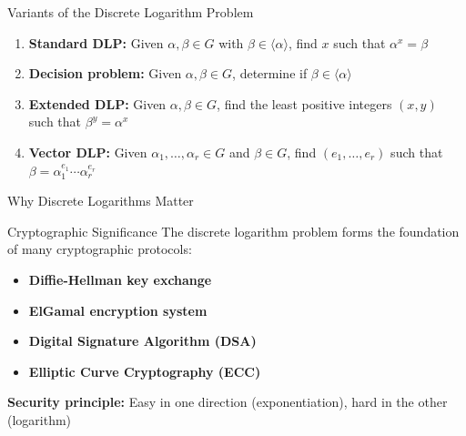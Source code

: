 \documentclass[aspectratio=169]{beamer}
\begin{document}
\begin{frame}{Variants of the Discrete Logarithm Problem}
  \begin{enumerate}
    \item \textbf{Standard DLP:} Given $\alpha, \beta \in G$ with $\beta \in \langle\alpha\rangle$, find $x$ such that $\alpha^x = \beta$
    
    \item \textbf{Decision problem:} Given $\alpha, \beta \in G$, determine if $\beta \in \langle\alpha\rangle$
    
    \item \textbf{Extended DLP:} Given $\alpha, \beta \in G$, find the least positive integers $(x,y)$ such that $\beta^y = \alpha^x$
    
    \item \textbf{Vector DLP:} Given $\alpha_1, \ldots, \alpha_r \in G$ and $\beta \in G$, find $(e_1, \ldots, e_r)$ such that $\beta = \alpha_1^{e_1} \cdots \alpha_r^{e_r}$
  \end{enumerate}
\end{frame}

\begin{frame}{Why Discrete Logarithms Matter}
  \begin{block}{Cryptographic Significance}
    The discrete logarithm problem forms the foundation of many cryptographic protocols:
  \end{block}
  
  \begin{itemize}
    \item \textbf{Diffie-Hellman key exchange}
    \item \textbf{ElGamal encryption system}
    \item \textbf{Digital Signature Algorithm (DSA)}
    \item \textbf{Elliptic Curve Cryptography (ECC)}
  \end{itemize}
  
  \textbf{Security principle:} Easy in one direction (exponentiation), hard in the other (logarithm)
\end{frame}
\end{document}
